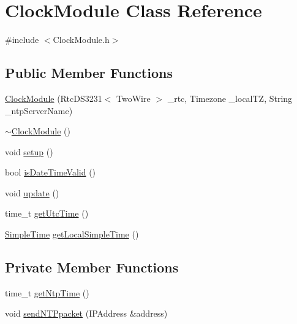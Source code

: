 \hypertarget{class_clock_module}{}\section{Clock\+Module Class Reference}
\label{class_clock_module}


{\ttfamily \#include $<$Clock\+Module.\+h$>$}

\subsection*{Public Member Functions}
\begin{DoxyCompactItemize}
\item 
\mbox{\hyperlink{class_clock_module_a13599210b0032bbc5312d93e690c763b}{Clock\+Module}} (Rtc\+D\+S3231$<$ Two\+Wire $>$ \+\_\+rtc, Timezone \+\_\+local\+TZ, String \+\_\+ntp\+Server\+Name)
\item 
\mbox{\hyperlink{class_clock_module_a7e2e3fc944235bc3d779150fb2ea5063}{$\sim$\+Clock\+Module}} ()
\item 
void \mbox{\hyperlink{class_clock_module_a6113cfe778efff0aa237696f85516796}{setup}} ()
\item 
bool \mbox{\hyperlink{class_clock_module_a05053d7409ef43d1729113a7912fa866}{is\+Date\+Time\+Valid}} ()
\item 
void \mbox{\hyperlink{class_clock_module_afbc823bb09d912dbdc25f9d38ec78624}{update}} ()
\item 
time\+\_\+t \mbox{\hyperlink{class_clock_module_af0faab0171ded0fdb37dcbff757f451e}{get\+Utc\+Time}} ()
\item 
\mbox{\hyperlink{class_simple_time}{Simple\+Time}} \mbox{\hyperlink{class_clock_module_aa208cd29a002d60e4e5f064813acf9f3}{get\+Local\+Simple\+Time}} ()
\end{DoxyCompactItemize}
\subsection*{Private Member Functions}
\begin{DoxyCompactItemize}
\item 
time\+\_\+t \mbox{\hyperlink{class_clock_module_a4e1dc771d7467c2bd5e9c7885231982e}{get\+Ntp\+Time}} ()
\item 
void \mbox{\hyperlink{class_clock_module_a266855ecf4aa1f466d1a3556caff008c}{send\+N\+T\+Ppacket}} (I\+P\+Address \&address)
\end{DoxyCompactItemize}
